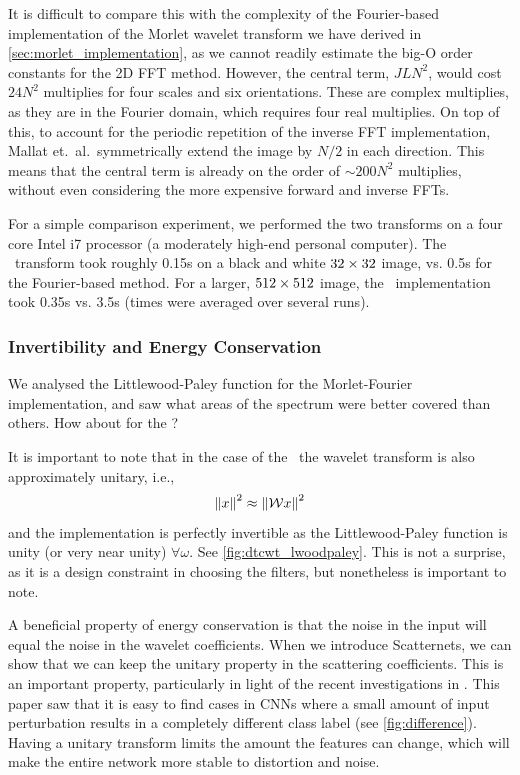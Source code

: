   It is difficult to compare this with the complexity of the Fourier-based
  implementation of the Morlet wavelet transform we have derived in
  \autoref{sec:morlet_implementation}, as we cannot readily estimate the big-O
  order constants for the 2D FFT method. However, the central term, $JLN^2$,
  would cost $24N^2$ multiplies for four scales and six orientations. These are
  complex multiplies, as they are in the Fourier domain, which requires
  four real multiplies. On top of this, to account for the periodic repetition 
  of the inverse FFT implementation, Mallat et.\ al.\ symmetrically extend the image by
  $N/2$ in each direction. This means that the central term is already on the
  order of $\sim 200N^2$ multiplies, without even considering the more
  expensive forward and inverse FFTs. 

  For a simple comparison experiment, we performed the two transforms on a four
  core Intel i7 processor (a moderately high-end personal computer). The
  \DTCWT\ transform took roughly 0.15s on a black and
  white $32\times 32$ image, vs. 0.5s for the Fourier-based method. For a larger,
  $512\times 512$ image, the \DTCWT\ implementation took 0.35s vs. 3.5s
  (times were averaged over several runs).
  
\subsubsection{Invertibility and Energy Conservation}
  We analysed the Littlewood-Paley function for the Morlet-Fourier
  implementation, and saw what areas of the spectrum were better covered than
  others. How about for the \DTCWT\@?

  It is important to note that in the case of the \DTCWT\, the wavelet
  transform is also approximately unitary, i.e.,\
  \begin{equation}
    \left\lVert x \right\rVert^2 \approx \left\lVert \mathcal{W}x \right\rVert^2
  \end{equation}
  and the implementation is perfectly invertible as the Littlewood-Paley
  function is unity (or very near unity) $\forall \omega$. See
  \autoref{fig:dtcwt_lwoodpaley}. This is not a surprise, as it is a design
  constraint in choosing the filters, but nonetheless is important to note. 

  A beneficial property of energy conservation is that the noise in the input
  will equal the noise in the wavelet coefficients. When we introduce
  Scatternets, we can show that we can keep the unitary property in the
  scattering coefficients. This is an important property, particularly in light
  of the recent investigations in \citep{szegedy_intriguing_2013}. This paper
  saw that it is easy to find cases in CNNs where a small amount of input
  perturbation results in a completely different class label (see
  \autoref{fig:difference}). Having a unitary transform limits the
  amount the features can change, which will make the entire network more
  stable to distortion and noise.

